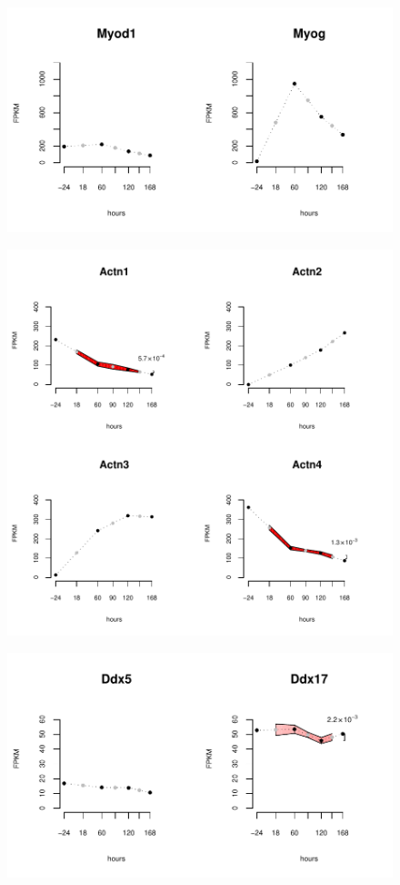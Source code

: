\documentclass[12pt]{amsart}
\theoremstyle{definition}
\begin{document}
\begin{figure}[!ht] 
    \includegraphics{pdfs/MyoD_Myog.pdf}
\end{figure}
\newpage
\begin{figure}[!ht] 
    \includegraphics{pdfs/Actn.pdf}
\end{figure}
\begin{figure}[!ht] 
    \includegraphics{pdfs/Ddx.pdf}
\end{figure}
\end{document}
